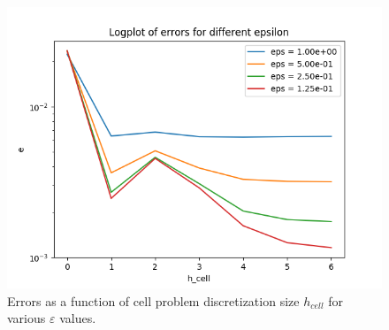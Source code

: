 \documentclass{article}
\renewcommand{\epsilon}{\varepsilon}
\begin{document}
  \begin{figure}[h]
    \centering
    \includegraphics[width=0.8\linewidth]{2d_cell_errors.png}
    \caption{Errors as a function of cell problem discretization size $h_{cell}$ for various $\epsilon$ values.}
    \label{fig:two_dim_cell_problem_errors}
 \end{figure}
\end{document}
